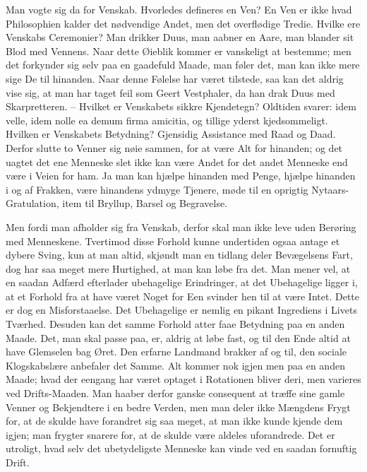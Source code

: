 \documentclass[12pt,a4paper]{article}
\begin{document}
Man vogte sig da for Venskab. Hvorledes defineres en Ven? En Ven er ikke hvad Philosophien kalder det nødvendige Andet, men det overflødige Tredie. Hvilke ere Venskabs Ceremonier? Man drikker Duus, man aabner en Aare, man blander sit Blod med Vennens. Naar dette Øieblik kommer er vanskeligt at bestemme; men det forkynder sig selv paa en gaadefuld Maade, man føler det, man kan ikke mere sige De til hinanden. Naar denne Følelse har været tilstede, saa kan det aldrig vise sig, at man har taget feil som Geert Vestphaler, da han drak Duus med Skarpretteren. – Hvilket er Venskabets sikkre Kjendetegn? Oldtiden svarer: idem velle, idem nolle ea demum firma amicitia, og tillige yderst kjedsommeligt. Hvilken er Venskabets Betydning? Gjensidig Assistance med Raad og Daad. Derfor slutte to Venner sig nøie sammen, for at være Alt for hinanden; og det uagtet det ene Menneske slet ikke kan være Andet for det andet Menneske end være i Veien for ham. Ja man kan hjælpe hinanden med Penge, hjælpe hinanden i og af Frakken, være hinandens ydmyge Tjenere, møde til en oprigtig Nytaars-Gratulation, item til Bryllup, Barsel og Begravelse.

Men fordi man afholder sig fra Venskab, derfor skal man ikke leve uden Berøring med Menneskene. Tvertimod disse Forhold kunne undertiden ogsaa antage et dybere Sving, kun at man altid, skjøndt man en tidlang deler Bevægelsens Fart, dog har saa meget mere Hurtighed, at man kan løbe fra det. Man mener vel, at en saadan Adfærd efterlader ubehagelige Erindringer, at det Ubehagelige ligger i, at et Forhold fra at have været Noget for Een svinder hen til at være Intet. Dette er dog en Misforstaaelse. Det Ubehagelige er nemlig en pikant Ingrediens i Livets Tværhed. Desuden kan det samme Forhold atter faae Betydning paa en anden Maade. Det, man skal passe paa, er, aldrig at løbe fast, og til den Ende altid at have Glemselen bag Øret. Den erfarne Landmand brakker af og til, den sociale Klogskabslære anbefaler det Samme. Alt kommer nok igjen men paa en anden Maade; hvad der eengang har været optaget i Rotationen bliver deri, men varieres ved Drifts-Maaden. Man haaber derfor ganske consequent at træffe sine gamle Venner og Bekjendtere i en bedre Verden, men man deler ikke Mængdens Frygt for, at de skulde have forandret sig saa meget, at man ikke kunde kjende dem igjen; man frygter snarere for, at de skulde være aldeles uforandrede. Det er utroligt, hvad selv det ubetydeligste Menneske kan vinde ved en saadan fornuftig Drift.
\end{document}
